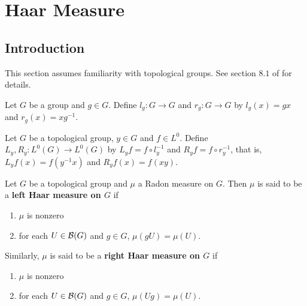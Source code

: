 \documentclass{book}
\begin{document}
	
	
	
	
	
	
	
	
	
	
	
	
	
	
	
	
	
	
	
	
	
	
	
	
	


	
	


















	\newpage
	\chapter{Haar Measure}
	
	\section{Introduction}
	
	\begin{note}
	This section assumes familiarity with topological groups. See section $8.1$ of \cite{analysis} for details. 
	\end{note}

	\begin{defn}  
		Let $G$ be a group and $g \in G$. Define $l_g:G \rightarrow G$ and $r_g:G \rightarrow G$ by $l_g(x) = gx$ and $r_g(x) = xg^{-1}$. 
	\end{defn}

	\begin{defn}  
		Let $G$ be a topological group, $y \in G$ and $f \in L^0$.  Define $L_y, R_y: L^0(G) \rightarrow L^0(G)$ by $L_y f = f \circ l_y^{-1}$ and $R_y f = f \circ r_y^{-1}$, that is, $L_yf(x) = f(y^{-1}x)$ and $R_yf(x) = f(xy)$.
	\end{defn}
	
	\begin{defn}  
		Let $G$ be a topological group and $\mu$ a Radon measure on $G$. Then $\mu$ is said to be a \textbf{left Haar measure on $G$} if 
		\begin{enumerate}
			\item $\mu$ is nonzero  
			\item for each $U \in \mathcal{B}(G)$ and $g \in G$, $\mu(gU) = \mu(U)$.  
		\end{enumerate}
		Similarly, $\mu$ is said to be a \textbf{right Haar measure on $G$} if 
		\begin{enumerate}
			\item $\mu$ is nonzero  
			\item for each $U \in \mathcal{B}(G)$ and $g \in G$, $\mu(Ug) = \mu(U)$.  
		\end{enumerate}
	\end{defn}
	
\end{document}
